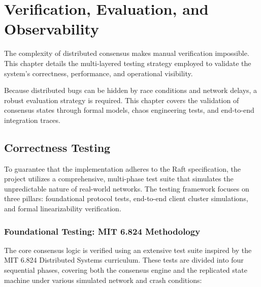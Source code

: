 \chapter{Verification, Evaluation, and Observability}
\label{ch:verification}

The complexity of distributed consensus makes manual verification impossible. This chapter details the multi-layered testing strategy employed to validate the system’s correctness, performance, and operational visibility.

Because distributed bugs can be hidden by race conditions and network delays, a robust evaluation strategy is required. This chapter covers the validation of consensus states through formal models, chaos engineering tests, and end-to-end integration traces.

\section{Correctness Testing}
\label{sec:correctness_testing}

To guarantee that the implementation adheres to the Raft specification, the project utilizes a comprehensive, multi-phase test suite that simulates the unpredictable nature of real-world networks. The testing framework focuses on three pillars: foundational protocol tests, end-to-end client cluster simulations, and formal linearizability verification.

\subsection{Foundational Testing: MIT 6.824 Methodology}
The core consensus logic is verified using an extensive test suite inspired by the MIT 6.824 Distributed Systems curriculum. These tests are divided into four sequential phases, covering both the consensus engine and the replicated state machine under various simulated network and crash conditions:

